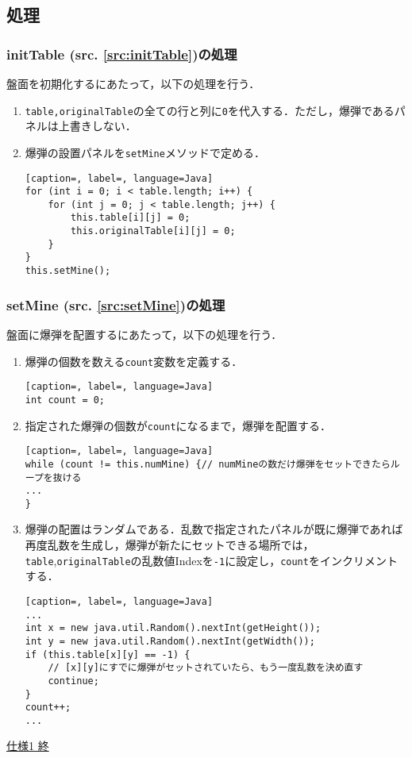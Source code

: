\documentclass[a4j,11pt]{jsarticle}
\newcommand{\srcref}[1]{src. \ref{#1}}
\newcommand{\met}[1]{\ttfamily #1 \normalfont (\srcref{src:#1})の処理}
\begin{document}
\subsection{処理}
\subsubsection*{\met{initTable}}
盤面を初期化するにあたって，以下の処理を行う．
\begin{enumerate}
    \item \verb|table,originalTable|の全ての行と列に\verb|0|を代入する．ただし，爆弾であるパネルは上書きしない．
    \item 爆弾の設置パネルを\verb|setMine|メソッドで定める．
          \begin{lstlisting}[caption=, label=, language=Java]
for (int i = 0; i < table.length; i++) {
    for (int j = 0; j < table.length; j++) {
        this.table[i][j] = 0;
        this.originalTable[i][j] = 0;
    }
}
this.setMine();
            \end{lstlisting}
\end{enumerate}
\subsubsection*{\met{setMine}}
盤面に爆弾を配置するにあたって，以下の処理を行う．
\begin{enumerate}
    \item 爆弾の個数を数える\verb|count|変数を定義する．
          \begin{lstlisting}[caption=, label=, language=Java]
int count = 0;
\end{lstlisting}
    \item 指定された爆弾の個数が\verb|count|になるまで，爆弾を配置する．
          \begin{lstlisting}[caption=, label=, language=Java]
while (count != this.numMine) {// numMineの数だけ爆弾をセットできたらループを抜ける
...
}
    \end{lstlisting}
    \item 爆弾の配置はランダムである．乱数で指定されたパネルが既に爆弾であれば再度乱数を生成し，爆弾が新たにセットできる場所では，\verb|table|,\verb|originalTable|の乱数値Indexを\verb|-1|に設定し，\verb|count|をインクリメントする．
          \begin{lstlisting}[caption=, label=, language=Java]
...
int x = new java.util.Random().nextInt(getHeight());
int y = new java.util.Random().nextInt(getWidth());
if (this.table[x][y] == -1) {
    // [x][y]にすでに爆弾がセットされていたら、もう一度乱数を決め直す
    continue;
}
count++;
...
    \end{lstlisting}
\end{enumerate}
\begin{flushright}
    \underline{仕様1 終}
\end{flushright}
\newpage
\end{document}
